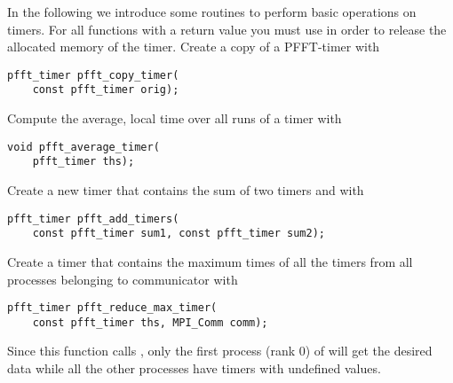 In the following we introduce some routines to perform basic operations on timers.
For all functions with a  return value you must use 
in order to release the allocated memory of the timer.
Create a copy of a PFFT-timer  with
\begin{lstlisting}
pfft_timer pfft_copy_timer(
    const pfft_timer orig);
\end{lstlisting}
Compute the average, local time over all runs of a timer  with
\begin{lstlisting}
void pfft_average_timer(
    pfft_timer ths);
\end{lstlisting}
Create a new timer that contains the sum of two timers  and  with
\begin{lstlisting}
pfft_timer pfft_add_timers(
    const pfft_timer sum1, const pfft_timer sum2);
\end{lstlisting}
Create a timer that contains the maximum times of all the timers  from all processes belonging to communicator  with
\begin{lstlisting}
pfft_timer pfft_reduce_max_timer(
    const pfft_timer ths, MPI_Comm comm);
\end{lstlisting}
Since this function calls , only the first process (rank 0) of  will get the desired data while all
the other processes have timers with undefined values.

